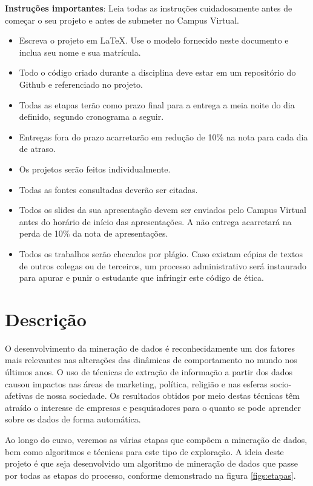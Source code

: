 \documentclass[a4 paper]{article}
\begin{document}

\textbf{Instruções importantes}: Leia todas as instruções cuidadosamente antes de começar o seu projeto e antes de submeter no Campus Virtual.
\begin{itemize}
    \item Escreva o projeto em \LaTeX. Use o modelo fornecido neste documento e inclua seu nome e sua matrícula.
    \item Todo o código criado durante a disciplina deve estar em um repositório do Github e referenciado no projeto.
    \item Todas as etapas terão como prazo final para a entrega a meia noite do dia definido, segundo cronograma a seguir.
    \item Entregas fora do prazo acarretarão em redução de 10\% na nota para cada dia de atraso.
    \item Os projetos serão feitos individualmente.
    \item Todas as fontes consultadas deverão ser citadas.
    \item Todos os slides da sua apresentação devem ser enviados pelo Campus Virtual antes do horário de início das apresentações. A não entrega acarretará na perda de 10\% da nota de apresentações. 
    \item Todos os trabalhos serão checados por plágio. Caso existam cópias de textos de outros colegas ou de terceiros, um processo administrativo será instaurado para apurar e punir o estudante que infringir este código de ética.
\end{itemize}

\section*{Descrição}

O desenvolvimento da mineração de dados é reconhecidamente um dos fatores mais relevantes nas alterações das dinâmicas de comportamento no mundo nos últimos anos. O uso de técnicas de extração de informação a partir dos dados causou impactos nas áreas de marketing, política, religião e nas esferas socio-afetivas de nossa sociedade. Os resultados obtidos por meio destas técnicas têm atraído o interesse de empresas e pesquisadores para o quanto se pode aprender sobre os dados de forma automática.

Ao longo do curso, veremos as várias etapas que compõem a mineração de dados, bem como algoritmos e técnicas para este tipo de exploração. A ideia deste projeto é que seja desenvolvido um algoritmo de mineração de dados que passe por todas as etapas do processo, conforme demonstrado na figura \ref{figs:etapas}.
\end{document}
